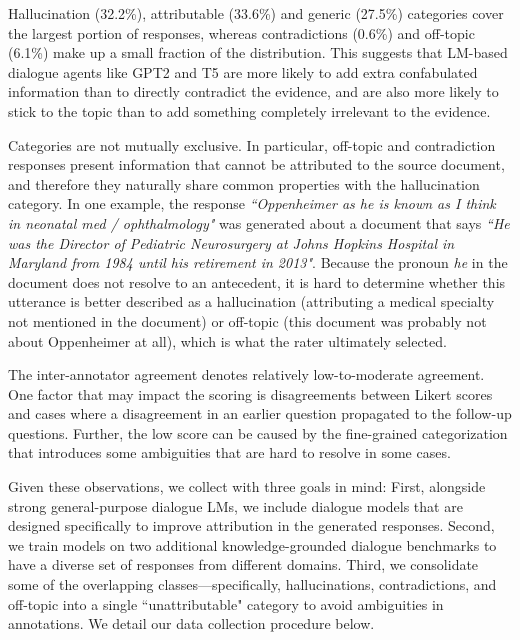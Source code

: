 \begin{remark}
\label{obs:one}
Hallucination (32.2\%), attributable (33.6\%) and generic (27.5\%) categories cover the largest portion of responses, whereas contradictions (0.6\%) and off-topic (6.1\%) make up a small fraction of the distribution. This suggests that LM-based dialogue agents like \textsc{GPT2} and \textsc{T5} are more likely to add extra confabulated information than to directly contradict the evidence, and are also more likely to stick to the topic than to add something completely irrelevant to the evidence. 
\end{remark} 

\begin{remark}
\label{obs:two}
 Categories are not mutually exclusive. In particular, off-topic and contradiction responses present information that cannot be attributed to the source document, and therefore they naturally share common properties with the %
 hallucination category. In one example, the response \emph{``Oppenheimer as he is known as I think in neonatal med / ophthalmology"} was generated about a document that says \emph{``He was the Director of Pediatric Neurosurgery at Johns Hopkins Hospital in Maryland from 1984 until his retirement in 2013"}. Because the pronoun \emph{he} in the document does not resolve to an antecedent, it is hard to determine whether this utterance is better described as a hallucination (attributing a medical specialty not mentioned in the document) or off-topic (this document was probably not about Oppenheimer at all), which is what the rater ultimately selected. 


\end{remark}

\begin{remark}
\label{obs:three}
 The inter-annotator agreement denotes relatively low-to-moderate agreement. One factor that may impact the scoring is disagreements between Likert scores and cases where a disagreement in an earlier question propagated to the follow-up questions. Further, the low score can be caused by the fine-grained categorization that introduces some ambiguities that are hard to resolve in some cases.  
\end{remark}

Given these observations, we collect \BEGIN{} with three goals in mind: First, alongside strong general-purpose dialogue LMs, we include dialogue models that are designed specifically to improve attribution in the generated responses. Second, we train models on two additional knowledge-grounded dialogue benchmarks to have a diverse set of responses from different domains. Third, we consolidate some of the overlapping classes---specifically, hallucinations, contradictions, and off-topic into a single ``unattributable" category to avoid ambiguities in annotations. We detail our data collection procedure below.